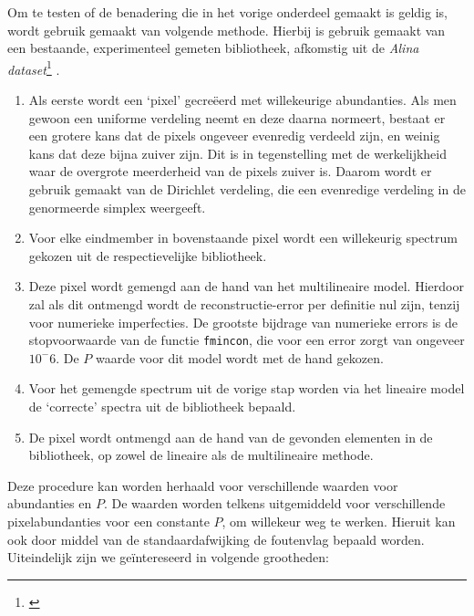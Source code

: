 \documentclass[12pt]{report}
\newcommand{\footcite}[1]{\cite{#1}\let\thefootnote\relax \footnote{\cite{#1} \bibentry{#1}} }
\begin{document}
Om te testen of de benadering die in het vorige onderdeel gemaakt is geldig is, wordt gebruik gemaakt van volgende methode. Hierbij is gebruik gemaakt van een bestaande, experimenteel gemeten bibliotheek, afkomstig uit de \textit{Alina dataset}\footcite{alina}.
\begin{enumerate}

\item Als eerste wordt een `pixel' gecre\"eerd met willekeurige abundanties. Als men gewoon een uniforme verdeling neemt en deze daarna normeert, bestaat er een grotere kans dat de pixels ongeveer evenredig verdeeld zijn, en weinig kans dat deze bijna zuiver zijn. Dit is in tegenstelling met de werkelijkheid waar de overgrote meerderheid van de pixels zuiver is. Daarom wordt er gebruik gemaakt van de Dirichlet verdeling, die een evenredige verdeling in de genormeerde simplex weergeeft. 

\item Voor elke eindmember in bovenstaande pixel wordt een willekeurig spectrum gekozen uit de respectievelijke bibliotheek.

\item Deze pixel wordt gemengd aan de hand van het multilineaire model. Hierdoor zal als dit ontmengd wordt de reconstructie-error per definitie nul zijn, tenzij voor numerieke imperfecties. De grootste bijdrage van numerieke errors is de stopvoorwaarde van de functie \texttt{fmincon}, die voor een error zorgt van ongeveer $10^-6$. De $P$ waarde voor dit model wordt met de hand gekozen.

\item Voor het gemengde spectrum uit de vorige stap worden via het lineaire model de `correcte' spectra uit de bibliotheek bepaald.

\item De pixel wordt ontmengd aan de hand van de gevonden elementen in de bibliotheek, op zowel de lineaire als de multilineaire methode.
\end{enumerate}

Deze procedure kan worden herhaald voor verschillende waarden voor abundanties en $P$. De waarden worden telkens uitgemiddeld voor verschillende pixelabundanties voor een constante $P$, om willekeur weg te werken. Hieruit kan ook door middel van de standaardafwijking de foutenvlag bepaald worden. Uiteindelijk zijn we ge\"intereseerd in volgende grootheden:
\end{document}

